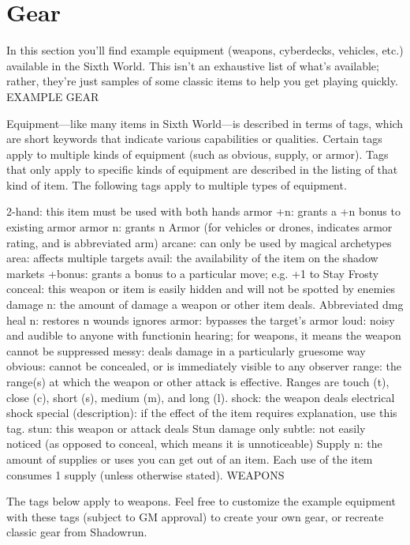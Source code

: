 \chapter{Gear} \label{Gear}

In this section you’ll find example equipment (weapons, cyberdecks, vehicles, etc.) available in the Sixth World. This isn’t an exhaustive list of what’s available; rather, they’re just samples of some classic items to help you get playing quickly.
EXAMPLE GEAR

Equipment—like many items in Sixth World—is described in terms of tags, which are short keywords that indicate various capabilities or qualities. Certain tags apply to multiple kinds of equipment (such as obvious, supply, or armor). Tags that only apply to specific kinds of equipment are described in the listing of that kind of item. The following tags apply to multiple types of equipment.

2-hand: this item must be used with both hands
armor +n: grants a +n bonus to existing armor
armor n: grants n Armor (for vehicles or drones, indicates armor rating, and is abbreviated arm)
arcane: can only be used by magical archetypes
area: affects multiple targets
avail: the availability of the item on the shadow markets
+bonus: grants a bonus to a particular move; e.g. +1 to Stay Frosty
conceal: this weapon or item is easily hidden and will not be spotted by enemies
damage n: the amount of damage a weapon or other item deals. Abbreviated dmg
heal n: restores n wounds
ignores armor: bypasses the target’s armor
loud: noisy and audible to anyone with functionin hearing; for weapons, it means the weapon cannot be suppressed
messy: deals damage in a particularly gruesome way
obvious: cannot be concealed, or is immediately visible to any observer
range: the range(s) at which the weapon or other attack is effective. Ranges are touch (t), close (c), short (s), medium (m), and long (l).
shock: the weapon deals electrical shock
special (description): if the effect of the item requires explanation, use this tag.
stun: this weapon or attack deals Stun damage only
subtle: not easily noticed (as opposed to conceal, which means it is unnoticeable)
Supply n: the amount of supplies or uses you can get out of an item. Each use of the item consumes 1 supply (unless otherwise stated).
WEAPONS

The tags below apply to weapons. Feel free to customize the example equipment with these tags (subject to GM approval) to create your own gear, or recreate classic gear from Shadowrun.

